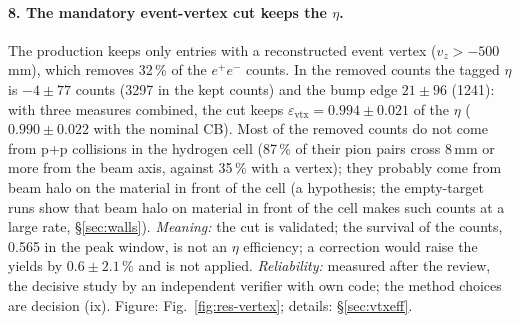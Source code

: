 \documentclass[11pt,a4paper]{article}
\newcommand{\ee}{\ensuremath{e^{+}e^{-}}\xspace}
\newcommand{\vz}{\ensuremath{v_z}\xspace}
\begin{document}
\paragraph{8. The mandatory event-vertex cut keeps the $\eta$.} The production keeps only entries with a reconstructed event vertex
($\vz>-500$\,mm), which removes 32\,\% of the \ee counts. In the removed counts the tagged $\eta$ is $-4\pm77$ counts (3297 in the kept counts)
and the bump edge $21\pm96$ (1241): with three measures combined, the cut keeps $\varepsilon_{\mathrm{vtx}}=0.994\pm0.021$ of the
$\eta$ ($0.990\pm0.022$ with the nominal CB). Most of the removed counts do not come from p+p collisions in the hydrogen cell (87\,\% of their pion
pairs cross 8\,mm or more from the beam axis, against 35\,\% with a vertex); they probably come from beam halo on the material in front
of the cell (a hypothesis; the empty-target runs show that beam halo on material in front of the cell makes such counts at a large rate, \S\ref{sec:walls}). \emph{Meaning:} the cut is validated; the survival of the counts, 0.565 in the peak window, is not an $\eta$ efficiency; a correction
would raise the yields by $0.6\pm2.1$\,\% and is not applied. \emph{Reliability:} measured after the review, the decisive study by an
independent verifier with own code; the method choices are decision (ix). Figure: Fig.~\ref{fig:res-vertex}; details: \S\ref{sec:vtxeff}.
\end{document}
